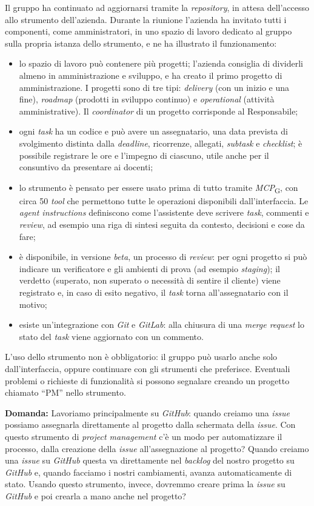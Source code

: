 \documentclass[12pt,a4paper]{article}
\newcommand{\gl}[1]{\emph{#1}\textsubscript{\scriptsize G}}
\newcommand{\tightlist}{\setlength{\itemsep}{1pt}\setlength{\parskip}{0pt}}
\begin{document}
Il gruppo ha continuato ad aggiornarsi tramite la \emph{repository}, in attesa dell'accesso allo strumento dell'azienda. Durante la riunione l'azienda ha invitato tutti i componenti, come amministratori, in uno spazio di lavoro dedicato al gruppo sulla propria istanza dello strumento, e ne ha illustrato il funzionamento:
\begin{itemize}
\tightlist
\item lo spazio di lavoro può contenere più progetti; l'azienda consiglia di dividerli almeno in amministrazione e sviluppo, e ha creato il primo progetto di amministrazione. I progetti sono di tre tipi: \emph{delivery} (con un inizio e una fine), \emph{roadmap} (prodotti in sviluppo continuo) e \emph{operational} (attività amministrative). Il \emph{coordinator} di un progetto corrisponde al Responsabile;
\item ogni \emph{task} ha un codice e può avere un assegnatario, una data prevista di svolgimento distinta dalla \emph{deadline}, ricorrenze, allegati, \emph{subtask} e \emph{checklist}; è possibile registrare le ore e l'impegno di ciascuno, utile anche per il consuntivo da presentare ai docenti;
\item lo strumento è pensato per essere usato prima di tutto tramite \gl{MCP}, con circa 50 \emph{tool} che permettono tutte le operazioni disponibili dall'interfaccia. Le \emph{agent instructions} definiscono come l'assistente deve scrivere \emph{task}, commenti e \emph{review}, ad esempio una riga di sintesi seguita da contesto, decisioni e cose da fare;
\item è disponibile, in versione \emph{beta}, un processo di \emph{review}: per ogni progetto si può indicare un verificatore e gli ambienti di prova (ad esempio \emph{staging}); il verdetto (superato, non superato o necessità di sentire il cliente) viene registrato e, in caso di esito negativo, il \emph{task} torna all'assegnatario con il motivo;
\item esiste un'integrazione con \emph{Git} e \emph{GitLab}: alla chiusura di una \emph{merge request} lo stato del \emph{task} viene aggiornato con un commento.
\end{itemize}
L'uso dello strumento non è obbligatorio: il gruppo può usarlo anche solo dall'interfaccia, oppure continuare con gli strumenti che preferisce. Eventuali problemi o richieste di funzionalità si possono segnalare creando un progetto chiamato ``PM'' nello strumento.

\textbf{Domanda:} Lavoriamo principalmente su \emph{GitHub}: quando creiamo una \emph{issue} possiamo assegnarla direttamente al progetto dalla schermata della \emph{issue}. Con questo strumento di \emph{project management} c'è un modo per automatizzare il processo, dalla creazione della \emph{issue} all'assegnazione al progetto? Quando creiamo una \emph{issue} su \emph{GitHub} questa va direttamente nel \emph{backlog} del nostro progetto su \emph{GitHub} e, quando facciamo i nostri cambiamenti, avanza automaticamente di stato. Usando questo strumento, invece, dovremmo creare prima la \emph{issue} su \emph{GitHub} e poi crearla a mano anche nel progetto?
\end{document}
